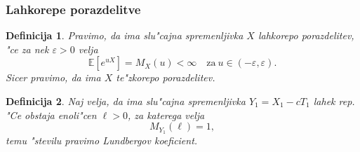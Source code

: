 \documentclass[]{beamer} %
\theoremstyle{plain}
\newtheorem{definicija}{Definicija}
\newcommand{\E}{\mathbb{E}}
\begin{document}
\begin{frame}
  \frametitle{Lahkorepe porazdelitve}
  \begin{definicija}
    Pravimo, da ima slu"cajna spremenljivka $X$ \textit{lahkorepo porazdelitev}, "ce za 
    nek $\varepsilon > 0$ velja
  \begin{equation*}
      \E\left[e^{uX}\right] = M_X(u) < \infty \quad \text{za} \ u \in (-\varepsilon, \varepsilon).
  \end{equation*}
  Sicer pravimo, 
  da ima $X$ \textit{te"zkorepo porazdelitev}.
  \label{def:lahkorepnaPorazdelitev}
  \end{definicija}
  \pause
  \begin{definicija}
    Naj velja, da ima slu"cajna spremenljivka $Y_1 = X_1 - cT_1$
    lahek rep. "Ce obstaja enoli"cen $\ell > 0$, za katerega velja
    \begin{equation*}
        M_{Y_1}(\ell)  = 1,
    \end{equation*}
    temu "stevilu pravimo \textit{Lundbergov koeficient}.
    \label{def:LundbergovKoeficient}
  \end{definicija}
\end{frame}
\end{document}
